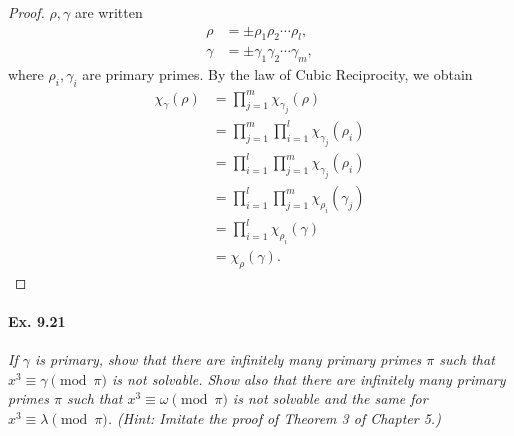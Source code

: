 \documentclass[11pt,a4paper]{article}
\begin{document}
\begin{proof}


$\rho, \gamma$ are written
\begin{align*}
\rho&=\pm\rho_1\rho_2\cdots\rho_l,\\
\gamma &= \pm \gamma_1 \gamma_2\cdots \gamma_m, 
\end{align*}
 where $\rho_i,\gamma_i$ are primary primes.
By the law of Cubic Reciprocity, we obtain
\begin{align*}
\chi_\gamma(\rho) &= \prod_{j=1}^m \chi_{\gamma_j}(\rho)\\
& = \prod_{j=1}^m\prod_{i=1}^l \chi_{\gamma_j}(\rho_{i})\\
& = \prod_{i=1}^l\prod_{j=1}^m \chi_{\gamma_j}(\rho_{i})\\
& = \prod_{i=1}^l\prod_{j=1}^m \chi_{\rho_i}(\gamma_j)\\
&=\prod_{i=1}^l \chi_{\rho_i}(\gamma)\\
&=\chi_{\rho}( \gamma).
\end{align*}
\end{proof}

\paragraph{Ex. 9.21}

{\it If $\gamma$ is primary, show that there are infinitely many primary primes $\pi$ such that $x^3 \equiv \gamma \pmod \pi$ is not solvable. Show also that there are infinitely many primary primes $\pi$ such that $x^3 \equiv \omega \pmod \pi$ is not solvable and the same for $x^3 \equiv \lambda \pmod \pi$. (Hint: Imitate the proof of Theorem 3 of Chapter 5.)
}
\end{document}
